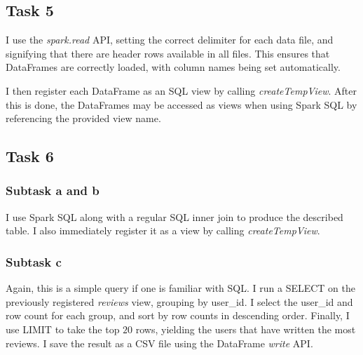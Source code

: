 \documentclass[a4paper]{article}
\begin{document}
\subsection{Task 5}
I use the \emph{spark.read} API, setting the correct delimiter for each data file, and signifying that there are header rows available in all files. This ensures that DataFrames are correctly loaded, with column names being set automatically.

I then register each DataFrame as an SQL view by calling \emph{createTempView}. After this is done, the DataFrames may be accessed as views when using Spark SQL by referencing the provided view name.


\subsection{Task 6}

\subsubsection{Subtask a and b}
I use Spark SQL along with a regular SQL inner join to produce the described table. I also immediately register it as a view by calling \emph{createTempView}.

\subsubsection{Subtask c}
Again, this is a simple query if one is familiar with SQL. I run a SELECT on the previously registered \emph{reviews} view, grouping by user\_id. I select the user\_id and row count for each group, and sort by row counts in descending order. Finally, I use LIMIT to take the top $20$ rows, yielding the users that have written the most reviews. I save the result as a CSV file using the DataFrame \emph{write} API.
\end{document}

